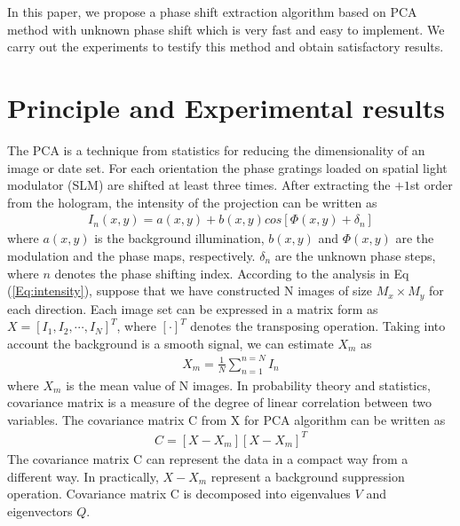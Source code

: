 \documentclass[letterpaper,10pt]{article}
\begin{document}
In this paper, we propose a phase shift extraction algorithm based on PCA method with unknown phase shift which is very fast and easy to implement.
We carry out the experiments to testify this method and obtain satisfactory results.

\section{Principle and Experimental results}
The PCA is a technique from statistics for reducing the dimensionality of an image or date set\cite{Vargas2011}.
For each orientation the phase gratings loaded on spatial light modulator (SLM) are shifted at least three times.
After extracting the $+1$st order from the hologram, the intensity of the projection can be written as
\begin{eqnarray}
 I_{n}(x,y) = a(x,y) + b(x,y)cos[ \Phi(x,y) + \delta_n ] \label{Eq:intensity}
\end{eqnarray}
where $a(x,y)$ is the background illumination, $b(x,y)$ and $\Phi(x,y)$ are the modulation and the phase maps, respectively.
$\delta_n$ are the unknown phase steps, where $n$ denotes the phase shifting index.
According to the analysis in Eq (\ref{Eq:intensity}), suppose that we have constructed N images of size $M_x \times M_y$ for each direction.
Each image set can be expressed in a matrix form as $X = [I_1,I_2,\cdots,I_N]^{T}$, where $[\cdot]^T$ denotes the transposing operation.
Taking into account the background is a smooth signal, we can estimate $X_m$ as
\begin{eqnarray}
X_m = \frac{1}{N}\sum_{n=1}^{n=N}I_n \label{Eq:MeanValue}
\end{eqnarray}
where $X_m$ is the mean value of N images.
In probability theory and statistics, covariance matrix is a measure of the degree of linear correlation between two variables.
The covariance matrix C from X for PCA algorithm can be written as
\begin{eqnarray}
C = [X - X_m][X-X_m]^T \label{Eq:covariance}
\end{eqnarray}
The covariance matrix C can represent the data in a compact way from a different way.
In practically, $X-X_m$ represent a background suppression operation.
Covariance matrix C is decomposed into eigenvalues $V$ and eigenvectors $Q$.
\end{document}
